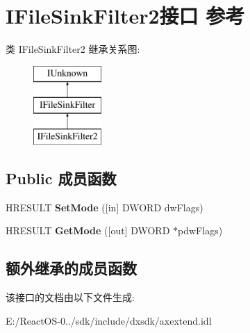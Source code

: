 \hypertarget{interface_i_file_sink_filter2}{}\section{I\+File\+Sink\+Filter2接口 参考}
\label{interface_i_file_sink_filter2}
类 I\+File\+Sink\+Filter2 继承关系图\+:\begin{figure}[H]
\begin{center}
\leavevmode
\includegraphics[height=3.000000cm]{interface_i_file_sink_filter2}
\end{center}
\end{figure}
\subsection*{Public 成员函数}
\begin{DoxyCompactItemize}
\item 
\mbox{\label{interface_i_file_sink_filter2_aa19d1b1d5722f5bc7b1c62e6e960872e}} 
H\+R\+E\+S\+U\+LT {\bfseries Set\+Mode} (\mbox{[}in\mbox{]} D\+W\+O\+RD dw\+Flags)
\item 
\mbox{\label{interface_i_file_sink_filter2_a1aae98142fa174259be9a68b5fba0f22}} 
H\+R\+E\+S\+U\+LT {\bfseries Get\+Mode} (\mbox{[}out\mbox{]} D\+W\+O\+RD $\ast$pdw\+Flags)
\end{DoxyCompactItemize}
\subsection*{额外继承的成员函数}


该接口的文档由以下文件生成\+:\begin{DoxyCompactItemize}
\item 
E\+:/\+React\+O\+S-\/0../sdk/include/dxsdk/axextend.\+idl\end{DoxyCompactItemize}
